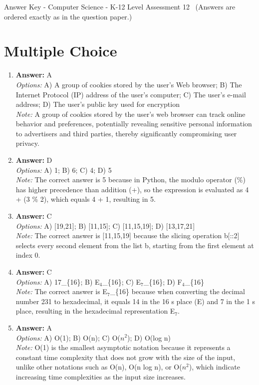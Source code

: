 \documentclass[12pt]{article}
\begin{document}
\begin{center}
Answer Key - Computer Science - K-12 Level Assessment 12 \
\small (Answers are ordered exactly as in the question paper.)
\end{center}

\section*{Multiple Choice}
\begin{enumerate}[label=\arabic*.]
\item \textbf{Answer:} A
\\ \textit{Options:} A) A group of cookies stored by the user's Web browser; B) The Internet Protocol (IP) address of the user's computer; C) The user's e-mail address; D) The user's public key used for encryption
\\ \textit{Note:} A group of cookies stored by the user's web browser can track online behavior and preferences, potentially revealing sensitive personal information to advertisers and third parties, thereby significantly compromising user privacy.
\item \textbf{Answer:} D
\\ \textit{Options:} A) 1; B) 6; C) 4; D) 5
\\ \textit{Note:} The correct answer is 5 because in Python, the modulo operator (\%) has higher precedence than addition (+), so the expression is evaluated as 4 + (3 \% 2), which equals 4 + 1, resulting in 5.
\item \textbf{Answer:} C
\\ \textit{Options:} A) [19,21]; B) [11,15]; C) [11,15,19]; D) [13,17,21]
\\ \textit{Note:} The correct answer is [11,15,19] because the slicing operation b[::2] selects every second element from the list b, starting from the first element at index 0.
\item \textbf{Answer:} C
\\ \textit{Options:} A) 17\_\{16\}; B) E$_{4}$\_\{16\}; C) E$_{7}$\_\{16\}; D) F$_{4}$\_\{16\}
\\ \textit{Note:} The correct answer is E$_{7}$\_\{16\} because when converting the decimal number 231 to hexadecimal, it equals 14 in the 16 s place (E) and 7 in the 1 s place, resulting in the hexadecimal representation E$_{7}$.
\item \textbf{Answer:} A
\\ \textit{Options:} A) O(1); B) O(n); C) O($n^2$); D) O(log n)
\\ \textit{Note:} O(1) is the smallest asymptotic notation because it represents a constant time complexity that does not grow with the size of the input, unlike other notations such as O(n), O(n log n), or O($n^2$), which indicate increasing time complexities as the input size increases.
\end{enumerate}
\end{document}
